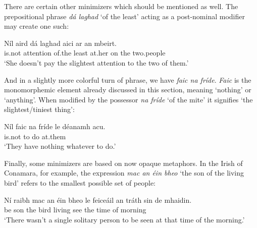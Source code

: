 \documentclass[output=paper,colorlinks,citecolor=brown]{langscibook}
\begin{document}
There are certain other minimizers which should be mentioned as well. The prepositional phrase {\itshape dá laghad} `of the least' acting as a post-nominal modifier may create one such:

\ea
\gll Níl aird dá laghad aici ar an mbeirt. \\
     {is.not} attention {of.the} least at.her on the two.people \\
\glt `She doesn't pay the slightest attention to the two of them.'
\z


And in a slightly more colorful turn of phrase, we have {\itshape faic na fríde}. {\itshape Faic} is the monomorphemic element already discussed in this section, meaning `nothing' or `anything'. When modified by the possessor {\itshape na fríde} `of the mite' it signifies `the slightest/tiniest thing':

\ea
\gll Níl {faic na fríde} le déanamh acu. \\
     {is.not} {} to {do\vn} at.them \\
\glt `They have nothing whatever to do.'
\z


Finally, some minimizers are based on now opaque metaphors. In the Irish of Conamara, for example, the expression {\itshape mac an éin bheo} `the son of the living bird' refers to the smallest possible set of people:

\ea
\gll Ní raibh mac an éin bheo le feiceáil an tráth sin de mhaidin. \\
     {\no} {be\past} son the {bird\gen} {living\gen} {\asp} {see\vn} the time {\seo} of morning \\
\glt `There wasn't a single solitary person to be seen at that time of the morning.'
\z

\end{document}
